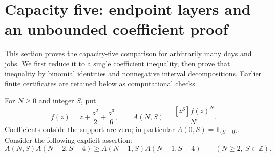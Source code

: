 \documentclass[11pt]{article}
\begin{document}
\section{Capacity five: endpoint layers and an unbounded coefficient proof}
This section proves the capacity-five comparison for arbitrarily many
days and jobs. We first reduce it to a single coefficient inequality,
then prove that inequality by binomial identities and nonnegative
interval decompositions. Earlier finite certificates are retained
below as computational checks.

For $N\geq0$ and integer $S$, put
\[
 f(z)=z+\frac{z^2}{2}+\frac{z^3}{6},\qquad
 A(N,S)=\frac{[z^S]f(z)^N}{N!}.
\]
Coefficients outside the support are zero; in particular
$A(0,S)=\mathbf1_{\{S=0\}}$. Consider the following explicit assertion:
\begin{equation}\label{eq:fivecoefficient}
 A(N,S)A(N-2,S-4)
 \geq A(N-1,S)A(N-1,S-4)
 \qquad(N\geq2,\ S\in\mathbb Z).
\end{equation}
\end{document}
